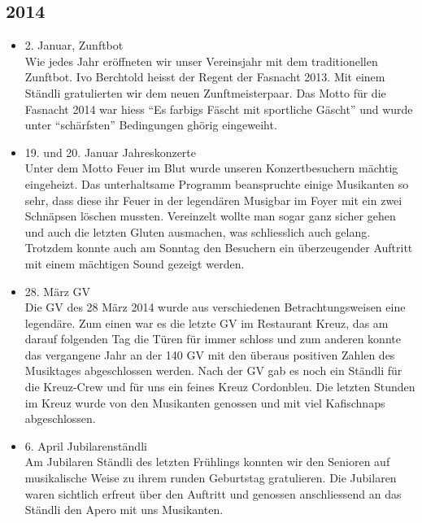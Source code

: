 \subsection*{2014}
\begin{history}


    \begin{itemize}

        \item 2. Januar, Zunftbot\\
              Wie jedes Jahr eröffneten wir unser Vereinsjahr mit dem traditionellen
              Zunftbot. Ivo Berchtold heisst der Regent der Fasnacht 2013. Mit einem
              Ständli gratulierten wir dem neuen Zunftmeisterpaar. Das Motto für die
              Fasnacht 2014 war hiess \enquote{Es farbigs Fäscht mit sportliche
                  Gäscht} und wurde unter \enquote{schärfsten} Bedingungen ghörig
              eingeweiht.

        \item 19. und 20. Januar Jahreskonzerte\\
              Unter dem Motto Feuer im Blut wurde unseren Konzertbesuchern mächtig
              eingeheizt. Das unterhaltsame Programm beanspruchte einige Musikanten so
              sehr, dass diese ihr Feuer in der legendären Musigbar im Foyer mit ein
              zwei Schnäpsen löschen mussten. Vereinzelt wollte man sogar ganz sicher
              gehen und auch die letzten Gluten ausmachen, was schliesslich auch
              gelang. Trotzdem konnte auch am Sonntag den Besuchern ein überzeugender
              Auftritt mit einem mächtigen Sound gezeigt werden.

        \item 28. März GV\\
              Die GV des 28 März 2014 wurde aus verschiedenen Betrachtungsweisen eine
              legendäre. Zum einen war es die letzte GV im Restaurant Kreuz, das am
              darauf folgenden Tag die Türen für immer schloss und zum anderen konnte
              das vergangene Jahr an der 140 GV mit den überaus positiven Zahlen des
              Musiktages abgeschlossen werden. Nach der GV gab es noch ein Ständli für
              die Kreuz-Crew und für uns ein feines Kreuz Cordonbleu.  Die letzten
              Stunden im Kreuz wurde von den Musikanten  genossen und mit viel
              Kafischnaps abgeschlossen.

        \item 6. April Jubilarenständli\\
              Am Jubilaren Ständli des letzten Frühlings konnten wir den Senioren auf
              musikalische Weise zu ihrem runden Geburtstag gratulieren. Die Jubilaren
              waren sichtlich erfreut über den Auftritt und genossen anschliessend an
              das Ständli den Apero mit uns Musikanten.


\end{itemize}
\end{history}
